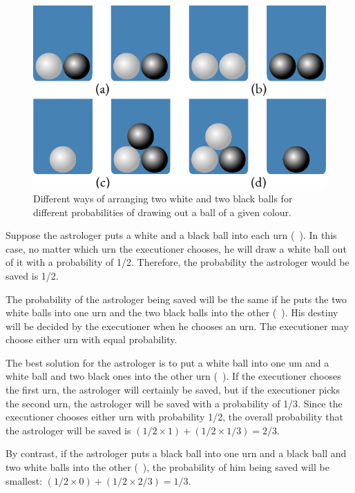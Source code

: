 \begin{figure}[!ht]
 \centering
 \includegraphics[width=0.75\tfwidth]{figures/ball-picking.pdf}
\caption{Different ways of arranging two white and two black balls for
  different probabilities of drawing out a ball of a given colour.\label{ball-picking}}
 \end{figure}

Suppose the astrologer puts a white and a black ball into each urn
(~). In this case, no matter which urn the executioner chooses, he will draw a white ball out of it with a probability of 1/2. Therefore, the probability the astrologer would be saved is 1/2.

The probability of the astrologer being saved will be the same if he
puts the two white balls into one urn and the two black balls into the
other (~). His destiny will be decided by the executioner when he chooses an urn. The executioner may choose either urn with equal probability.

The best solution for the astrologer is to put a white ball into one um
and a white ball and two black ones into the other urn (~). If the executioner chooses the ﬁrst urn, the astrologer will certainly be saved, but if the executioner picks the second urn, the astrologer will be saved with a probability of {1/3}. Since the executioner chooses either urn with probability {1/2}, the overall probability that the astrologer will be saved is $(1/2 \times 1)+(1/2 \times 1/3)=2/3$.

By contrast, if the astrologer puts a black ball into one urn and
a black ball and two white balls into the other (~), the probability of him being saved will be smallest: $(1/2 \times 0)+(1/2 \times 2/3) = 1/3$.

